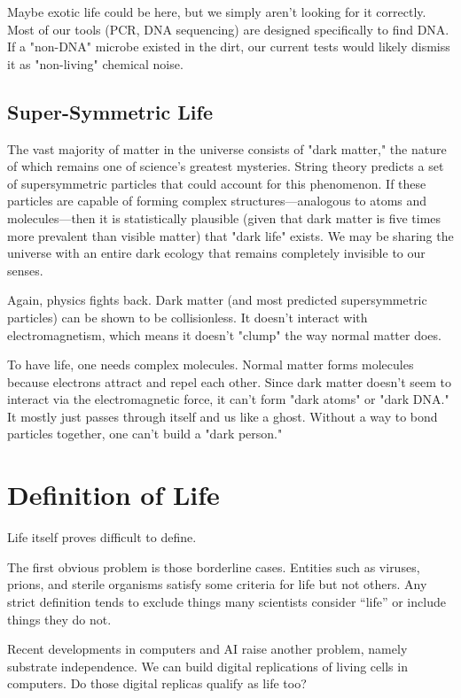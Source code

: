 Maybe exotic life could be here, but we simply aren't looking for it correctly.
Most of our tools (PCR, DNA sequencing) are designed specifically to find DNA.
If a "non-DNA" microbe existed in the dirt, our current tests would likely dismiss it as "non-living" chemical noise.


\subsection*{Super-Symmetric Life}

The vast majority of matter in the universe consists of "dark matter," the nature of which remains one of science's greatest mysteries.
String theory predicts a set of supersymmetric particles that could account for this phenomenon.
If these particles are capable of forming complex structures—analogous to atoms and molecules—then it is statistically plausible (given that dark matter is five times more prevalent than visible matter) that "dark life" exists.
We may be sharing the universe with an entire dark ecology that remains completely invisible to our senses.

Again, physics fights back. Dark matter (and most predicted supersymmetric particles) can be shown to be collisionless.
It doesn't interact with electromagnetism, which means it doesn't "clump" the way normal matter does.

To have life, one needs complex molecules. Normal matter forms molecules because electrons attract and repel each other.
Since dark matter doesn't seem to interact via the electromagnetic force, it can't form "dark atoms" or "dark DNA."
It mostly just passes through itself and us like a ghost. Without a way to bond particles together, one can't build a "dark person."



\section{Definition of Life}

Life itself proves difficult to define.

The first obvious problem is those borderline cases. Entities such as viruses, prions, and sterile organisms
satisfy some criteria for life but not others. Any strict definition tends to exclude things many
scientists consider ``life'' or include things they do not.

Recent developments in computers and AI raise another problem, namely substrate independence.
We can build digital replications of living cells in computers. Do those digital replicas qualify as life too?

